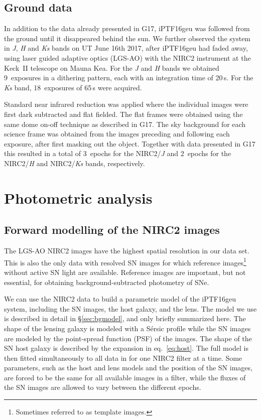 \documentclass[a4paper,fleqn,usenatbib]{mnras}
\newcommand{\geu}{iPTF16geu\xspace}
\newcommand{\scipap}{G17\xspace}
\newcommand{\sn}{SN\xspace}
\newcommand{\sne}{SNe\xspace}
\newcommand{\jband}{{\it J}\xspace}
\newcommand{\hband}{{\it H}\xspace}
\newcommand{\ksband}{{\it Ks}\xspace}
\begin{document}
\subsection{Ground data}
In addition to the data already presented in \scipap, \geu was followed from the ground until it disappeared behind 
the sun.  We further observed the system in \jband, \hband and \ksband bands on UT June 16th 2017, after \geu had faded away, 
using laser guided adaptive optics (LGS-AO) with the NIRC2 instrument at the Keck~II telescope on Mauna Kea.  For the 
\jband and \hband bands we obtained 9~exposures in a dithering pattern, each with an integration time of 20\,s.  For the \ksband band, 
18~exposures of 65\,s were acquired. 

Standard near infrared reduction was applied where the individual images were first dark subtracted and flat fielded.  The flat 
frames were obtained using the same dome on-off technique as described in \scipap.  The sky background for each science 
frame was obtained from the images preceding and following each exposure, after first masking out the object.  
Together with data presented in \scipap this resulted in a total of 3~epochs for the NIRC2/\jband and 2~epochs for the 
NIRC2/\hband and NIRC2/\ksband bands, respectively.


\section{Photometric analysis}
\subsection{Forward modelling of the NIRC2 images}\label{sec:nirc2}
The LGS-AO NIRC2 images have the highest spatial resolution in our data set.  This is also the only data with resolved 
\sn images for which reference images\footnote{Sometimes referred to as template images.} without active \sn light are  
available.  Reference images are important, but not essential, for obtaining background-subtracted photometry of \sne.

We can use the NIRC2 data to build a parametric model of the \geu system, including the \sn images, the host galaxy, and 
the lens.  The model we use is described in detail in \S\ref{sec:bgmodel}, and only briefly summarized here. 
The shape of the lensing galaxy is modeled with a S\'ersic profile \citep{1963BAAA....6...41S} while the \sn images are 
modeled by the point-spread function (PSF) of the images.  The shape of the \sn host galaxy is described by the expansion 
in eq.~\eqref{eq:host}.  The full model is then fitted simultaneously to all data in for one NIRC2 filter 
at a time.  Some parameters,  such as the host and lens models and the position of the \sn images, are forced to be 
the same for all available images in a filter, while the fluxes of the \sn images are allowed to vary between the 
different epochs.
\end{document}
